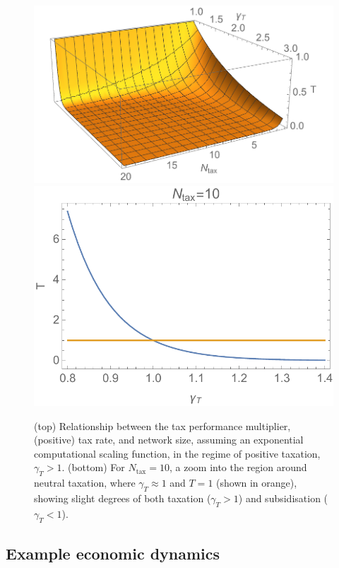 \documentclass[aps, rmp, twocolumn, amsmath, amssymb, nofootinbib, superscriptaddress, longbibliography, floatfix, table-of-contents, eqsecnum]{revtex4-1}
\begin{document}
\begin{figure}[!htb]
\includegraphics[width=\columnwidth]{tax_exp} \\
\includegraphics[width=\columnwidth]{tax_subsidy}
\caption{(top) Relationship between the tax performance multiplier, (positive) tax rate, and network size, assuming an exponential computational scaling function, in the regime of positive taxation, \mbox{$\gamma_T>1$}. (bottom) For \mbox{$N_\text{tax}=10$}, a zoom into the region around neutral taxation, where \mbox{$\gamma_T\approx 1$} and \mbox{$T=1$} (shown in orange), showing slight degrees of both taxation (\mbox{$\gamma_T>1$}) and subsidisation (\mbox{$\gamma_T<1$}).}\label{fig:tax_exp}	
\end{figure}

%
%

\subsection{Example economic dynamics}
\end{document}

